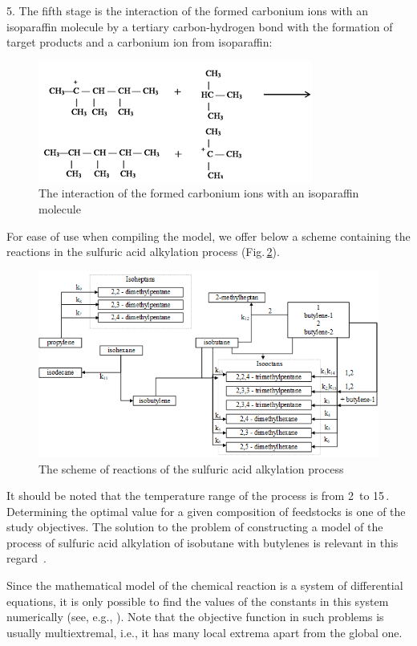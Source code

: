 \documentclass{svproc}
\begin{document}
5. The fifth stage is the interaction of the formed carbonium ions with an isoparaffin molecule by a tertiary carbon-hydrogen bond with the formation of target products and a carbonium ion from isoparaffin:

\begin{figure}
\centering
\includegraphics[height=3.5 cm]{fig5.png}
\caption{The interaction of the formed carbonium ions with an isoparaffin molecule}
\label{fig5}
\end{figure}

For ease of use when compiling the model, we offer below a scheme containing the reactions in the sulfuric acid alkylation process (Fig.\,\ref{fig6}).

\begin{figure}
\centering
\includegraphics[height=6.5 cm]{fig6.png}
\centering
\caption{The scheme of reactions of the sulfuric acid alkylation process}
\label{fig6}
\end{figure}

It should be noted that the temperature range of the process is from 2\,\textcelsius{} to 15\,\textcelsius{}. Determining the optimal value for a given composition of feedstocks is one of the study objectives. The solution to the problem of constructing a model of the process of sulfuric acid alkylation of isobutane with butylenes is relevant in this regard~\cite{alkylation_mod}.

Since the mathematical model of the chemical reaction is a system of differential equations, it is only possible to find the values of the constants in this system numerically (see, e.g., \cite{Gubaydullin2021}). Note that the objective function in such problems is usually multiextremal, i.e., it has many local extrema apart from the global one.
\end{document}
